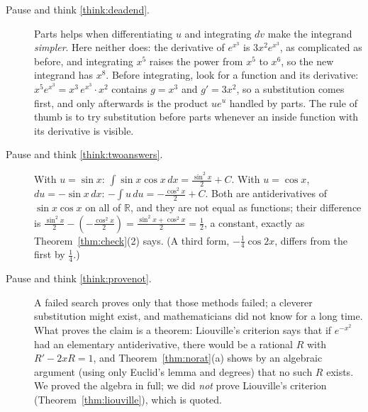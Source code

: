 \documentclass[11pt]{article}
\begin{document}
\begin{description}
  \item[Pause and think \ref{think:deadend}.] Parts helps when differentiating $u$ and integrating $dv$ make the integrand \emph{simpler}. Here neither does: the derivative of $e^{x^3}$ is $3x^2e^{x^3}$, as complicated as before, and integrating $x^5$ raises the power from $x^5$ to $x^6$, so the new integrand has $x^8$. Before integrating, look for a function and its derivative: $x^5e^{x^3}=x^3\,e^{x^3}\cdot x^2$ contains $g=x^3$ and $g'=3x^2$, so a substitution comes first, and only afterwards is the product $ue^u$ handled by parts. The rule of thumb is to try substitution before parts whenever an inside function with its derivative is visible.

  \item[Pause and think \ref{think:twoanswers}.] With $u=\sin x$: $\int\sin x\cos x\,dx=\frac{\sin^2x}2+C$. With $u=\cos x$, $du=-\sin x\,dx$: $-\int u\,du=-\frac{\cos^2x}2+C$. Both are antiderivatives of $\sin x\cos x$ on all of $\mathbb R$, and they are not equal as functions; their difference is $\frac{\sin^2x}2-\left(-\frac{\cos^2x}2\right)=\frac{\sin^2x+\cos^2x}2=\frac12$, a constant, exactly as Theorem~\ref{thm:check}(2) says. (A third form, $-\frac14\cos2x$, differs from the first by $\frac14$.)

  \item[Pause and think \ref{think:provenot}.] A failed search proves only that those methods failed; a cleverer substitution might exist, and mathematicians did not know for a long time. What proves the claim is a theorem: Liouville's criterion says that if $e^{-x^2}$ had an elementary antiderivative, there would be a rational $R$ with $R'-2xR=1$, and Theorem~\ref{thm:norat}(a) shows by an algebraic argument (using only Euclid's lemma and degrees) that no such $R$ exists. We proved the algebra in full; we did \emph{not} prove Liouville's criterion (Theorem~\ref{thm:liouville}), which is quoted.
\end{description}
\end{document}
